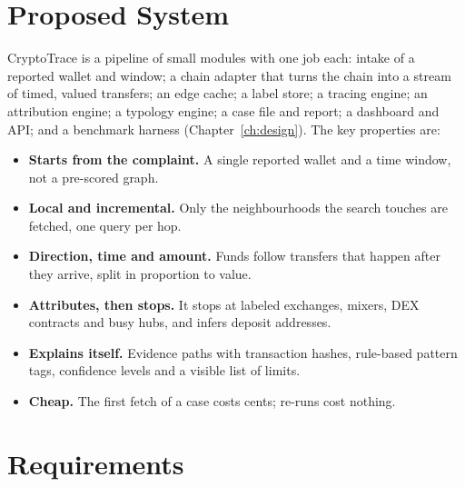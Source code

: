\section{Proposed System}
CryptoTrace is a pipeline of small modules with one job each: intake of a reported wallet and window; a chain adapter that turns the chain into a stream of timed, valued transfers; an edge cache; a label store; a tracing engine; an attribution engine; a typology engine; a case file and report; a dashboard and API; and a benchmark harness (Chapter~\ref{ch:design}). The key properties are:
\begin{itemize}
\item \textbf{Starts from the complaint.} A single reported wallet and a time window, not a pre-scored graph.
\item \textbf{Local and incremental.} Only the neighbourhoods the search touches are fetched, one query per hop.
\item \textbf{Direction, time and amount.} Funds follow transfers that happen after they arrive, split in proportion to value.
\item \textbf{Attributes, then stops.} It stops at labeled exchanges, mixers, DEX contracts and busy hubs, and infers deposit addresses.
\item \textbf{Explains itself.} Evidence paths with transaction hashes, rule-based pattern tags, confidence levels and a visible list of limits.
\item \textbf{Cheap.} The first fetch of a case costs cents; re-runs cost nothing.
\end{itemize}

\section{Requirements}
